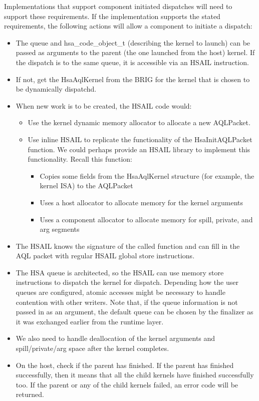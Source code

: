 \documentclass{book}
\newcommand{\reftyp}[1]{#1}
\begin{document}
\begin{appendices}
Implementations that support component initiated dispatches will
need to support these requirements. If the implementation supports
the stated requirements, the following actions will allow a
component to initiate a dispatch:
\begin{itemize}
\item The queue and \reftyp{hsa\_code\_object\_t} (describing the
kernel to launch) can be passed as arguments to the parent (the one
launched from the host) kernel. If the dispatch is to the same
queue, it is accessible via an HSAIL instruction.
\item If not, get the Hsa\-Aql\-Kernel from the BRIG for the
kernel that is chosen to be dynamically dispatchd.
\item When new work is to be created, the HSAIL code would\-:
\begin{itemize}
\item Use the kernel dynamic memory allocator to allocate a new
AQL\-Packet.
\item Use inline HSAIL to replicate the functionality of the
Hsa\-Init\-AQL\-Packet function. We could perhaps provide an
HSAIL library to implement this functionality. Recall this
function\-:
\begin{itemize}
\item Copies some fields from the Hsa\-Aql\-Kernel structure (for
example, the kernel ISA) to the AQL\-Packet
\item Uses a host allocator to allocate memory for the kernel
arguments
\item Uses a component allocator to allocate memory for spill,
private, and arg segments
\end{itemize}
\end{itemize}
\item The HSAIL knows the signature of the called function
and can fill in the AQL packet with regular HSAIL global
store instructions.
\item The HSA queue is architected, so the HSAIL can use
memory store instructions to dispatch the kernel for dispatch.
Depending how the user queues are configured, atomic accesses might
be necessary to handle contention with other writers. Note that, if
the queue information is not passed in as an argument, the default
queue can be chosen by the finalizer as it was exchanged earlier
from the runtime layer.
\item We also need to handle deallocation of the kernel arguments
and spill/private/arg space after the kernel completes.
\item On the host, check if the parent has finished. If the parent
has finished successfully, then it means that all the child kernels
have finished successfully too. If the parent or any of the child
kernels failed, an error code will be returned.
\end{itemize}


\end{appendices}
\end{document}
